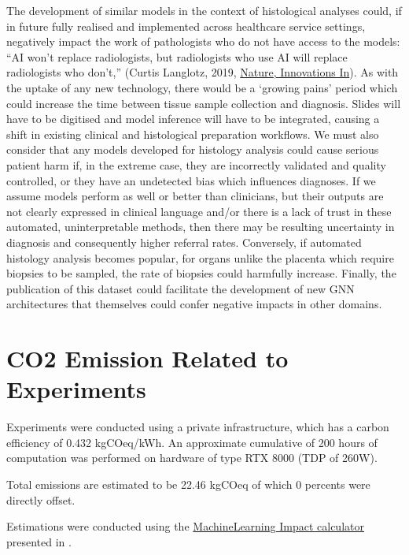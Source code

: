 \documentclass{article}
\begin{document}
The development of similar models in the context of histological analyses could, if in future fully realised and implemented across healthcare service settings, negatively impact the work of pathologists who do not have access to the models: “AI won’t replace radiologists, but radiologists who use AI will replace radiologists who don’t,” (Curtis Langlotz, 2019, \href{https://www.nature.com/articles/d41586-019-03847-z}{Nature, Innovations In}). As with the uptake of any new technology, there would be a ‘growing pains’ period which could increase the time between tissue sample collection and diagnosis. Slides will have to be digitised and model inference will have to be integrated, causing a shift in existing clinical and histological preparation workflows. We must also consider that any models developed for histology analysis could cause serious patient harm if, in the extreme case, they are incorrectly validated and quality controlled, or they have an undetected bias which influences diagnoses. If we assume models perform as well or better than clinicians, but their outputs are not clearly expressed in clinical language and/or there is a lack of trust in these automated, uninterpretable methods, then there may be resulting uncertainty in diagnosis and consequently higher referral rates. Conversely, if automated histology analysis becomes popular, for organs unlike the placenta which require biopsies to be sampled, the rate of biopsies could harmfully increase. Finally, the publication of this dataset could facilitate the development of new GNN architectures that themselves could confer negative impacts in other domains.


\section{CO2 Emission Related to Experiments}
\label{CO2}

Experiments were conducted using a private infrastructure, which has a carbon efficiency of 0.432 kgCOeq/kWh. An approximate cumulative of 200 hours of computation was performed on hardware of type RTX 8000 (TDP of 260W).

Total emissions are estimated to be 22.46 kgCOeq of which 0 percents were directly offset.

Estimations were conducted using the \href{https://mlco2.github.io/impact#compute}{MachineLearning Impact calculator} presented in \cite{lacoste_quantifying_2019}.
\end{document}
